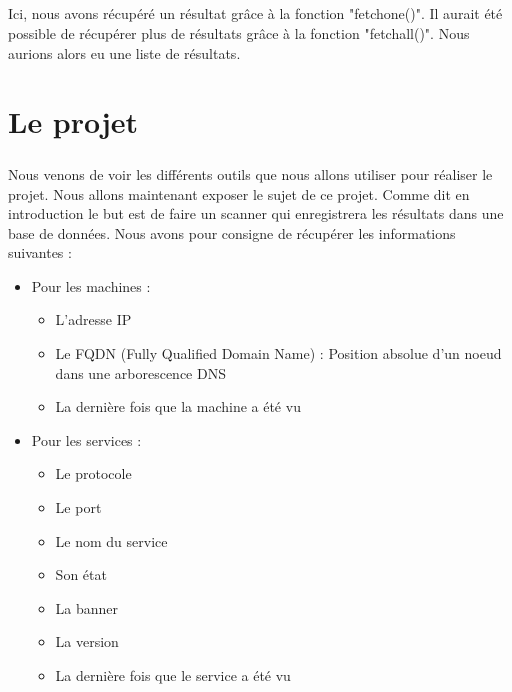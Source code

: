 \documentclass[12pt]{report}
\begin{document}
			\paragraph{}
				Ici, nous avons récupéré un résultat grâce à la fonction "fetchone()". Il aurait été possible de récupérer plus de résultats grâce à la fonction "fetchall()". Nous aurions alors eu une liste de résultats.
	\chapter{Le projet}
		\paragraph{}
			Nous venons de voir les différents outils que nous allons utiliser pour réaliser le projet. Nous allons maintenant exposer le sujet de ce projet. Comme dit en introduction le but est de faire un scanner qui enregistrera les résultats dans une base de données. Nous avons pour consigne de récupérer les informations suivantes :
			\begin{itemize}
				\item Pour les machines :
					\begin{itemize}
						\item L'adresse IP
						\item Le FQDN (Fully Qualified Domain Name) : Position absolue d'un noeud dans une arborescence DNS
						\item La dernière fois que la machine a été vu
					\end{itemize}
				\item Pour les services :
					\begin{itemize}
						\item Le protocole
						\item Le port
						\item Le nom du service
						\item Son état
						\item La banner
						\item La version
						\item La dernière fois que le service a été vu
					\end{itemize}
			\end{itemize}
\end{document}
